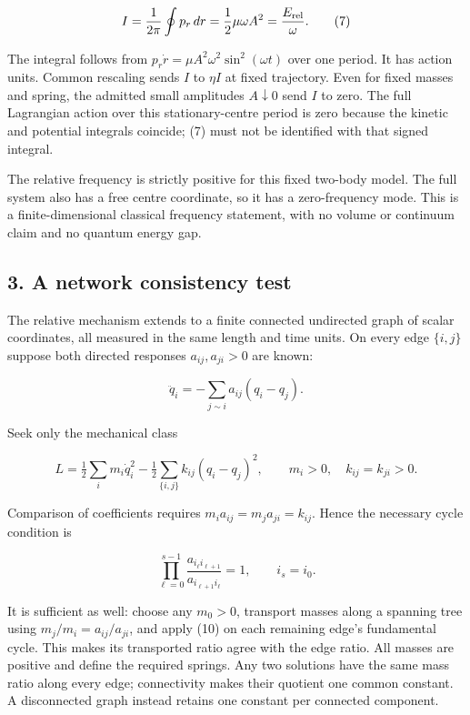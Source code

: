 \documentclass[11pt,a4paper]{article}
\begin{document}
\[I=\frac1{2\pi}\oint p_r\,dr
=\frac12\mu\omega A^2=\frac{E_{\rm rel}}\omega. \tag{7}\]

The integral follows from \(p_r\dot r=\mu A^2\omega^2\sin^2(\omega t)\)
over one period. It has action units. Common rescaling sends \(I\) to
\(\eta I\) at fixed trajectory. Even for fixed masses and spring, the
admitted small amplitudes \(A\downarrow0\) send \(I\) to zero. The full
Lagrangian action over this stationary-centre period is zero because the
kinetic and potential integrals coincide; (7) must not be identified
with that signed integral.

The relative frequency is strictly positive for this fixed two-body
model. The full system also has a free centre coordinate, so it has a
zero-frequency mode. This is a finite-dimensional classical frequency
statement, with no volume or continuum claim and no quantum energy gap.

\hypertarget{a-network-consistency-test}{%
\subsection{3. A network consistency
test}\label{a-network-consistency-test}}

The relative mechanism extends to a finite connected undirected graph of
scalar coordinates, all measured in the same length and time units. On
every edge \(\{i,j\}\) suppose both directed responses
\(a_{ij},a_{ji}>0\) are known:

\[\ddot q_i=-\sum_{j\sim i}a_{ij}(q_i-q_j). \tag{8}\]

Seek only the mechanical class

\[L=\tfrac12\sum_i m_i\dot q_i^2
-\tfrac12\sum_{\{i,j\}}k_{ij}(q_i-q_j)^2,
\qquad m_i>0,\quad k_{ij}=k_{ji}>0. \tag{9}\]

Comparison of coefficients requires \(m_i a_{ij}=m_j a_{ji}=k_{ij}\).
Hence the necessary cycle condition is

\[\prod_{\ell=0}^{s-1}
\frac{a_{i_\ell i_{\ell+1}}}{a_{i_{\ell+1}i_\ell}}=1,
\qquad i_s=i_0. \tag{10}\]

It is sufficient as well: choose any \(m_0>0\), transport masses along a
spanning tree using \(m_j/m_i=a_{ij}/a_{ji}\), and apply (10) on each
remaining edge's fundamental cycle. This makes its transported ratio
agree with the edge ratio. All masses are positive and define the
required springs. Any two solutions have the same mass ratio along every
edge; connectivity makes their quotient one common constant. A
disconnected graph instead retains one constant per connected component.
\end{document}
